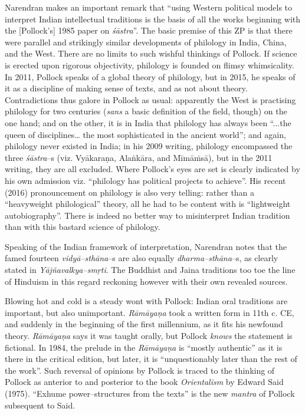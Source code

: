 Narendran makes an important remark that “using Western political models to interpret Indian intellectual traditions is the basis of all the works beginning with the [Pollock’s] 1985 paper on \textit{śāstra}”. The basic premise of this ZP is that there were parallel and strikingly similar developments of philology in India, China, and the West. There are no limits to such wishful thinkings of Pollock. If science is erected upon rigorous objectivity, philology is founded on flimsy whimsicality. In 2011, Pollock speaks of a global theory of philology, but in 2015, he speaks of it as a discipline of making sense of texts, and as not about theory. Contradictions thus galore in Pollock as usual: apparently the West is practising philology for two centuries (\textit{sans} a basic definition of the field, though) on the one hand; and on the other, it is in India that philology has always been “...the queen of disciplines… the most sophisticated in the ancient world”; and again, philology never existed in India; in his 2009 writing, philology encompassed the three \textit{śāstra}–s (viz. Vyākaraṇa, Alaṅkāra, and Mīmāṁsā), but in the 2011 writing, they are all excluded. Where Pollock’s eyes are set is clearly indicated by his own admission viz. “philology has political projects to achieve”. His recent (2016) pronouncement on philology is also very telling: rather than a “heavyweight philological” theory, all he had to be content with is “lightweight autobiography”. There is indeed no better way to misinterpret Indian tradition than with this bastard science of philology.

Speaking of the Indian framework of interpretation, Narendran notes that the famed fourteen \textit{vidyā–sthāna}–s are also equally \textit{dharma–sthāna}–s, as clearly stated in \textit{Yājñavalkya–smṛti}. The Buddhist and Jaina traditions too toe the line of Hinduism in this regard reckoning however with their own revealed sources.

Blowing hot and cold is a steady wont with Pollock: Indian oral traditions are important, but also unimportant. \textit{Rāmāyaṇa} took a written form in 11th c. CE, and suddenly in the beginning of the first millennium, as it fits his newfound theory. \textit{Rāmāyaṇa} says it was taught orally, but Pollock \textit{knows} the statement is fictional. In 1984, the prelude in the \textit{Rāmāyaṇa} is “mostly authentic” as it is there in the critical edition, but later, it is “unquestionably later than the rest of the work”. Such reversal of opinions by Pollock is traced to the thinking of Pollock as anterior to and posterior to the book \textit{Orientalism} by Edward Said (1975). “Exhume power–structures from the texts” is the new \textit{mantra} of Pollock subsequent to Said.

